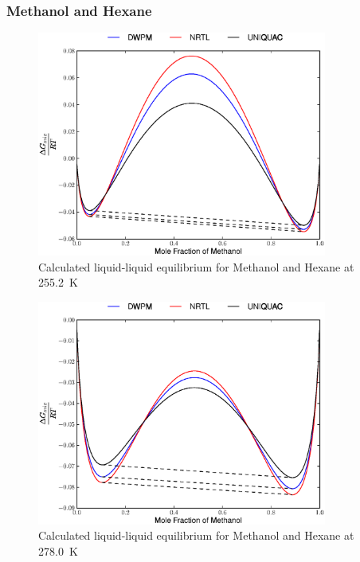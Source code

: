 \subsubsection*{Methanol and Hexane}


\begin{figure}[hp]
\centering
\includegraphics[width = 0.85\textwidth]{Results_Parts/BinaryParams/methanol-hexane/AllModelsGibbsPlots/T_255.2.eps}
\caption{Calculated liquid-liquid equilibrium for Methanol and Hexane at 255.2~$\mathrm{K}$} \label{methanol-hexane255}
\end{figure}

\begin{figure}[hp]
\centering
\includegraphics[width = 0.85\textwidth]{Results_Parts/BinaryParams/methanol-hexane/AllModelsGibbsPlots/T_278.0.eps}
\caption{Calculated liquid-liquid equilibrium for Methanol and Hexane at 278.0~$\mathrm{K}$} 
\end{figure}

